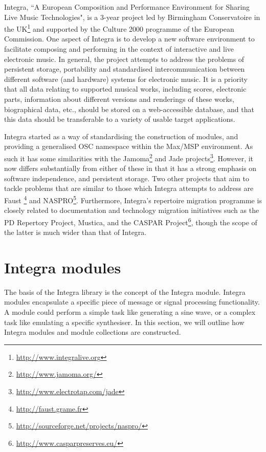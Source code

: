 \documentclass[10pt,journal,final]{IEEEtran}
\begin{document}
Integra, ``A European Composition and Performance Environment for Sharing Live Music Technologies", is a 3-year project led by Birmingham Conservatoire in the UK\footnote{\url{http://www.integralive.org}} and supported by the Culture 2000 programme of the European Commission. One aspect of Integra is to develop a new software environment to facilitate composing and performing in the context of interactive and live electronic music. In general, the project attempts to address the problems of persistent storage, portability and standardised intercommunication between different software (and hardware) systems for electronic music. It is a priority that all data relating to supported musical works, including scores, electronic parts, information about different versions and renderings of these works, biographical data, etc., should be stored on a web-accessible database, and that this data should be transferable to a variety of usable target applications.

Integra started as a way of standardising the construction of modules, and providing a generalised OSC namespace within the Max/MSP environment. As such it has some similarities with the Jamoma\cite{Place:01}\footnote{\url{http://www.jamoma.org/}} and Jade projects\footnote{\url{http://www.electrotap.com/jade}}. However, it now differs substantially from either of these in that it has a strong emphasis on software independence, and persistent storage. Two other projects that aim to tackle problems that are similar to those which Integra attempts to address are Faust \cite{Orlarey:01}\cite{Orlarey:02}\footnote{\url{http://faust.grame.fr}} and NASPRO\footnote{\url{http://sourceforge.net/projects/naspro/}}. Furthermore, Integra's repertoire migration programme \cite{BullockCoccioli:01} is closely related to documentation and technology migration initiatives such as the PD Repertory Project\cite{Puckette:01}, Mustica\cite{Bachimont:01}, and the CASPAR Project\footnote{\url{http://www.casparpreserves.eu/}}, though the scope of the latter is much wider than that of Integra.

\section{Integra modules}\label{sec:modules}

The basis of the Integra library is the concept of the Integra module. Integra modules encapsulate a specific piece of message or signal processing functionality. A module could perform a simple task like generating a sine wave, or a complex task like emulating a specific synthesiser. In this section, we will outline how Integra modules and module collections are constructed.
\end{document}
